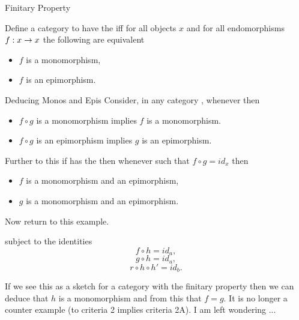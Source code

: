 \begin{frame}{Finitary Property}
\begin{definition}
Define a category \catcw to have the  iff for all objects $x$ and for all endomorphisms 
$f: x \rightarrow x$ the following are equivalent
\begin{itemize}
\item $f$ is a monomorphism,
\item $f$ is an epimorphism.
\end{itemize}
\end{definition}
\end{frame}

\begin{frame}{Deducing Monos and Epis}
Consider, in any category \catcw, whenever  then
\begin{itemize}
\item $f \circ g$ is a monomorphism implies $f$ is a monomorphism.
\item $f \circ g$ is an epimorphism implies $g$ is an epimorphism.
\end{itemize}
\medskip
Further to this if \catcw has the  then whenever  
such that $f \circ g = id_x$ then
\begin{itemize}
\item $f$ is a monomorphism and an epimorphism,
\item $g$ is a monomorphism and an epimorphism.
\end{itemize}
\end{frame}

\begin{frame}
Now return to this example.

subject to the identities
\begin{equation}
\label{fhidentity}
f \circ h = id_a,
\end{equation}
\begin{equation}
\label{ghidentity}
g \circ h = id_a,
\end{equation}
\begin{equation}
\label{rhhpidentity}
r \circ h \circ h' = id_b.
\end{equation}

If we see this as a sketch for a category with the finitary property then we can deduce that $h$ is a monomorphism
and from this that $f=g$.  It is no longer a counter example (to criteria 2 implies criteria 2A).
\medskip
I am left wondering ...  
\end{frame}

